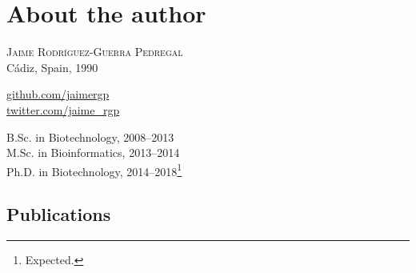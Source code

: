 
\chapter*{About the author}

\textsc{Jaime Rodríguez-Guerra Pedregal} \\
Cádiz, Spain, 1990

\href{https://github.com/jaimergp}{github.com/jaimergp} \\
\href{https://twitter.com/jaime_rgp}{twitter.com/jaime\_rgp}

B.Sc. in Biotechnology, 2008--2013 \\
M.Sc. in Bioinformatics, 2013--2014 \\
Ph.D. in Biotechnology, 2014--2018\footnote{Expected.}

\section*{Publications}

